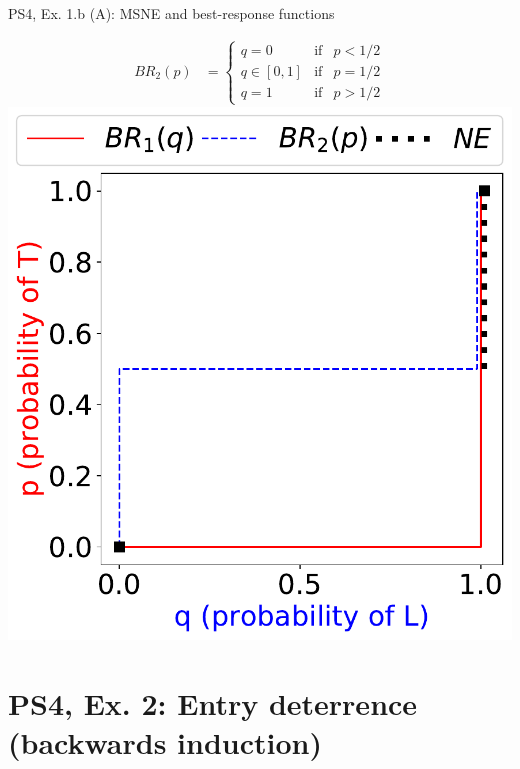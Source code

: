 \begin{frame}{PS4, Ex. 1.b (A): MSNE and best-response functions}
\begin{multicols}{2}
\begin{align*}
      BR_2(p)&=\left\{ \begin{array}{lcl}
          q=0       & \text{if} & p<1/2  \\
          q\in[0,1] & \text{if} & p=1/2 \\
          q=1       & \text{if} & p>1/2
      \end{array}\right.
    \end{align*}
    \vspace{-8pt}
    \includegraphics[width=\columnwidth]{figures/1b}
  \vfill\null
  \end{multicols}
\end{frame}



\section{PS4, Ex. 2: Entry deterrence (backwards induction)}

